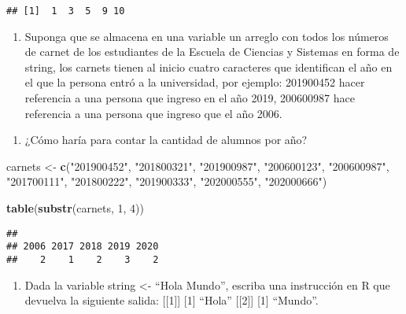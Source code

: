 \documentclass[
]{article}
\newenvironment{Shaded}{\begin{snugshade}}{\end{snugshade}}
\newcommand{\DecValTok}[1]{\textcolor[rgb]{0.00,0.00,0.81}{#1}}
\newcommand{\FunctionTok}[1]{\textcolor[rgb]{0.13,0.29,0.53}{\textbf{#1}}}
\newcommand{\NormalTok}[1]{#1}
\newcommand{\OtherTok}[1]{\textcolor[rgb]{0.56,0.35,0.01}{#1}}
\newcommand{\StringTok}[1]{\textcolor[rgb]{0.31,0.60,0.02}{#1}}
\providecommand{\tightlist}{%
  \setlength{\itemsep}{0pt}\setlength{\parskip}{0pt}}
\begin{document}
\begin{verbatim}
## [1]  1  3  5  9 10
\end{verbatim}

\begin{enumerate}
\def\labelenumi{\arabic{enumi}.}
\setcounter{enumi}{4}
\tightlist
\item
  Suponga que se almacena en una variable un arreglo con todos los
  números de carnet de los estudiantes de la Escuela de Ciencias y
  Sistemas en forma de string, los carnets tienen al inicio cuatro
  caracteres que identifican el año en el que la persona entró a la
  universidad, por ejemplo: 201900452 hacer referencia a una persona que
  ingreso en el año 2019, 200600987 hace referencia a una persona que
  ingreso que el año 2006.
\end{enumerate}

\begin{enumerate}
\def\labelenumi{\alph{enumi}.}
\tightlist
\item
  ¿Cómo haría para contar la cantidad de alumnos por año?
\end{enumerate}

\begin{Shaded}
\begin{Highlighting}[]
\NormalTok{carnets }\OtherTok{\textless{}{-}} \FunctionTok{c}\NormalTok{(}\StringTok{"201900452"}\NormalTok{, }\StringTok{"201800321"}\NormalTok{, }\StringTok{"201900987"}\NormalTok{, }\StringTok{"200600123"}\NormalTok{, }\StringTok{"200600987"}\NormalTok{, }
             \StringTok{"201700111"}\NormalTok{, }\StringTok{"201800222"}\NormalTok{, }\StringTok{"201900333"}\NormalTok{, }\StringTok{"202000555"}\NormalTok{, }\StringTok{"202000666"}\NormalTok{)}

\FunctionTok{table}\NormalTok{(}\FunctionTok{substr}\NormalTok{(carnets, }\DecValTok{1}\NormalTok{, }\DecValTok{4}\NormalTok{))}
\end{Highlighting}
\end{Shaded}

\begin{verbatim}
## 
## 2006 2017 2018 2019 2020 
##    2    1    2    3    2
\end{verbatim}

\begin{enumerate}
\def\labelenumi{\arabic{enumi}.}
\setcounter{enumi}{5}
\tightlist
\item
  Dada la variable string \textless- ``Hola Mundo'', escriba una
  instrucción en R que devuelva la siguiente salida: {[}{[}1{]}{]}
  {[}1{]} ``Hola'' {[}{[}2{]}{]} {[}1{]} ``Mundo''.
\end{enumerate}
\end{document}
